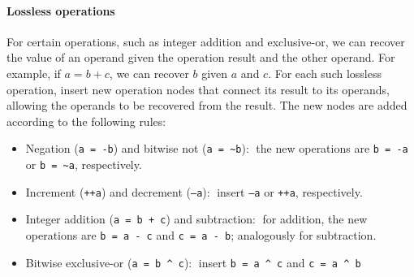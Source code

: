 \documentclass[12pt]{gatech-thesis}
\begin{document}
\paragraph{Lossless operations} For certain operations, such as integer addition and exclusive-or, we can recover the value of an operand given the operation result and the other operand. For example, if $a=b+c$, we can recover $b$ given $a$ and $c$. For each such lossless operation, insert new operation nodes that connect its result to its operands, allowing the operands to be recovered from the result. The new nodes are added according to the following rules:
\begin{itemize}
	\item Negation (\texttt{a = -b}) and bitwise not (\texttt{a = \textasciitilde b}):$\;$ the new operations are  \texttt{b = -a} or \texttt{b = \textasciitilde a}, respectively.
	
	\item Increment (\texttt{++a}) and decrement (\texttt{--a}):$\;$ insert \texttt{--a} or \texttt{++a}, respectively.
	
	\item Integer addition (\texttt{a = b + c}) and subtraction:$\;$ for addition, the new operations are \texttt{b = a - c} and \texttt{c = a - b}; analogously for subtraction.
	
	\item Bitwise exclusive-or (\texttt{a = b \textasciicircum{ }c}):$\;$ insert \texttt{b = a \textasciicircum{ }c} and \texttt{c = a \textasciicircum{ }b}
\end{itemize}

\end{document}

